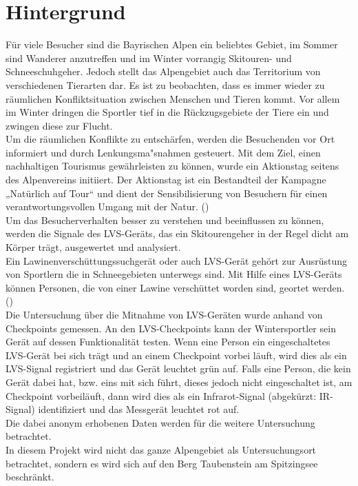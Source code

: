 \documentclass[12pt]{scrreprt}
\begin{document}
\chapter{Hintergrund}

Für viele Besucher sind die Bayrischen Alpen ein beliebtes Gebiet, im Sommer sind Wanderer anzutreffen und im Winter vorrangig Skitouren- und Schneeschuhgeher. Jedoch stellt das Alpengebiet auch das Territorium von verschiedenen Tierarten dar. Es ist zu beobachten, dass es immer wieder zu räumlichen Konfliktsituation zwischen Menschen und Tieren kommt. Vor allem im Winter dringen die Sportler tief in die Rückzugsgebiete der Tiere ein und zwingen diese zur Flucht. \\
Um die räumlichen Konflikte zu entschärfen, werden die Besuchenden vor Ort informiert und durch Lenkungsma"snahmen gesteuert. Mit dem Ziel, einen nachhaltigen Tourismus gewährleisten zu können, wurde ein Aktionstag seitens des Alpenvereins initiiert. Der Aktionstag ist ein Bestandteil der Kampagne „Natürlich auf Tour“ und dient der Sensibilisierung von Besuchern für einen verantwortungsvollen Umgang mit der Natur. 
(\cite{Alpenverein}) \\
Um das Besucherverhalten besser zu verstehen und beeinflussen zu können, werden die Signale des LVS-Geräts, das ein Skitourengeher in der Regel dicht am Körper trägt, ausgewertet und analysiert. \\
Ein Lawinenverschüttungssuchgerät oder auch LVS-Gerät gehört zur Ausrüstung von Sportlern die in Schneegebieten unterwegs sind. Mit Hilfe eines LVS-Geräts können Personen, die von einer Lawine verschüttet worden sind, geortet werden. (\cite{schweizerlawinen}) \\
Die Untersuchung über die Mitnahme von LVS-Geräten wurde anhand von Checkpoints gemessen. An den LVS-Checkpoints kann der Wintersportler sein Gerät auf dessen Funktionalität testen. Wenn eine Person ein eingeschaltetes LVS-Gerät bei sich trägt und an einem Checkpoint vorbei läuft, wird dies als ein LVS-Signal registriert und das Gerät leuchtet grün auf. Falls eine Person, die kein Gerät dabei hat, bzw. eins mit sich führt, dieses jedoch nicht eingeschaltet ist, am Checkpoint vorbeiläuft, dann wird dies als ein Infrarot-Signal (abgekürzt: IR-Signal) identifiziert und das Messgerät leuchtet rot auf. \\
Die dabei anonym erhobenen Daten werden für die weitere Untersuchung betrachtet. \\
In diesem Projekt wird nicht das ganze Alpengebiet als Untersuchungsort betrachtet, sondern es wird sich auf den Berg Taubenstein am Spitzingsee beschränkt. \\
\end{document}
